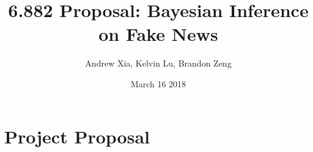\documentclass{article}
\title{6.882 Proposal: Bayesian Inference on Fake News}
\author{Andrew Xia, Kelvin Lu, Brandon Zeng}
\date{March 16 2018}
\begin{document}
\maketitle

\section{Project Proposal}



\nocite{*}


\end{document}
